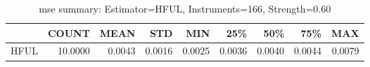 \begin{table}[ht]
\centering
\caption{mse summary: Estimator=HFUL, Instruments=166, Strength=0.60}
\begin{tabular}{lrrrrrrrr}
\toprule
 & COUNT & MEAN & STD & MIN & 25\% & 50\% & 75\% & MAX \\
\midrule
HFUL & 10.0000 & 0.0043 & 0.0016 & 0.0025 & 0.0036 & 0.0040 & 0.0044 & 0.0079 \\
\bottomrule
\end{tabular}
\end{table}
